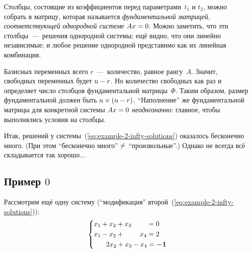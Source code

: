 \documentclass[a4paper,12pt]{article}
\begin{document}
  Столбцы, состоящие из коэффициентов перед параметрами~$t_1$ и $t_2$, можно собрать в матрицу, которая называется \emph{фундаментальной матрицей, соответствующей однородной системе $Ax \hm= 0$}.
  Можно заметить, что эти столбцы~---~решения однородной системы; ещё видно, что они линейно независимые; и любое решение однородной представимо как их линейная комбинация.
  
  Базисных переменных всего $r$~---~количество, равное рангу~$A$.
  Значит, свободных переменных будет $n \hm- r$.
  Но количество свободных как раз и определяет число столбцов фундаментальной матрицы~$\Phi$.
  Таким образом, размер фундаментальной должен быть $n \hm\times (n \hm- r)$.
  ``Наполнение'' же фундаментальной матрицы для конкретной системы $Ax \hm= 0$ \emph{неоднозначно}: главное, чтобы выполнялись условия на столбцы.

  Итак, решений у системы~(\ref{eq:example-2-infty-solutions}) оказалось бесконечно много.
  (При этом ``бесконечно много'' $\hm{\not=}$ ``произвольные''.)
  Однако не всегда всё складывается так хорошо...


  \subsection{Пример $0$}

  Рассмотрим ещё одну систему (``модификация'' второй~(\ref{eq:example-2-infty-solutions})):
  \begin{equation}\label{eq:example-3-no-solutions}
    \left\{ \begin{aligned}
      &x_1 + x_2 + x_3 \hphantom{{} + x_4} = 0\\
      &x_1 - x_2 + \hphantom{x_3 + {}} x_4 = 2\\
      &\hphantom{x_1 + } 2x_2 + x_3 - x_4 = \bds{-1}
    \end{aligned} \right.
  \end{equation}
\end{document}
